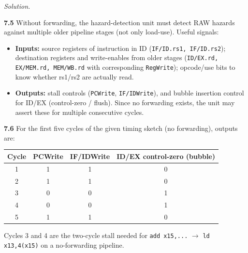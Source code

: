 \documentclass[12pt]{article}
\newenvironment{solution}{\par\noindent\textit{Solution.}\ }{\par\vspace{1.1em}}
\newcommand{\subproblem}[1]{\par\vspace{0.45em}\noindent\textbf{#1}\quad}
\begin{document}
\begin{solution}
\subproblem{7.5}
Without forwarding, the hazard-detection unit must detect RAW hazards against multiple older pipeline stages (not only load-use). Useful signals:
\begin{itemize}
\item \textbf{Inputs:} source registers of instruction in ID (\texttt{IF/ID.rs1, IF/ID.rs2}); destination registers and write-enables from older stages (\texttt{ID/EX.rd, EX/MEM.rd, MEM/WB.rd} with corresponding \texttt{RegWrite}); opcode/use bits to know whether rs1/rs2 are actually read.
\item \textbf{Outputs:} stall controls (\texttt{PCWrite}, \texttt{IF/IDWrite}), and bubble insertion control for ID/EX (control-zero / flush). Since no forwarding exists, the unit may assert these for multiple consecutive cycles.
\end{itemize}

\subproblem{7.6}
For the first five cycles of the given timing sketch (no forwarding), outputs are:
\begin{center}
\begin{tabular}{@{}cccc@{}}
\toprule
Cycle & PCWrite & IF/IDWrite & ID/EX control-zero (bubble) \\
\midrule
1 & 1 & 1 & 0 \\
2 & 1 & 1 & 0 \\
3 & 0 & 0 & 1 \\
4 & 0 & 0 & 1 \\
5 & 1 & 1 & 0 \\
\bottomrule
\end{tabular}
\end{center}
Cycles 3 and 4 are the two-cycle stall needed for \texttt{add x15,...} $\rightarrow$ \texttt{ld x13,4(x15)} on a no-forwarding pipeline.
\end{solution}
\end{document}
